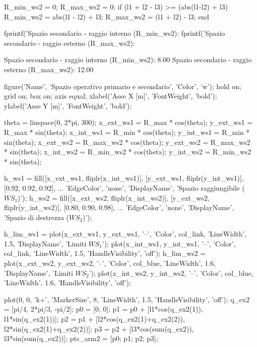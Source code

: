 \documentclass[11pt, a4paper]{article}
\begin{document}
\begin{matlabcode}
R_min_ws2 = 0;
R_max_ws2 = 0;
if (l1 + l2 - l3) >= (abs(l1-l2) + l3)
    R_min_ws2 = abs(l1 - l2) + l3;
    R_max_ws2 = (l1 + l2) - l3;
end

fprintf('Spazio secondario - raggio interno (R_min_ws2): %
fprintf('Spazio secondario - raggio esterno (R_max_ws2): %
\end{matlabcode}
\begin{matlaboutput}
Spazio secondario - raggio interno (R_min_ws2): 8.00
Spazio secondario - raggio esterno (R_max_ws2): 12.00
\end{matlaboutput}
\newpage
\begin{matlabcode}
figure('Name', 'Spazio operativo primario e secondario', 'Color', 'w');
hold on; grid on; box on; axis equal;
xlabel('Asse X [m]', 'FontWeight', 'bold');
ylabel('Asse Y [m]', 'FontWeight', 'bold');

theta = linspace(0, 2*pi, 300);
x_ext_ws1 = R_max * cos(theta);      y_ext_ws1 = R_max * sin(theta);
x_int_ws1 = R_min * cos(theta);      y_int_ws1 = R_min * sin(theta);
x_ext_ws2 = R_max_ws2 * cos(theta);  y_ext_ws2 = R_max_ws2 * sin(theta);
x_int_ws2 = R_min_ws2 * cos(theta);  y_int_ws2 = R_min_ws2 * sin(theta);

h_ws1 = fill([x_ext_ws1, fliplr(x_int_ws1)], [y_ext_ws1, fliplr(y_int_ws1)], [0.92, 0.92, 0.92], ...
    'EdgeColor', 'none', 'DisplayName', 'Spazio raggiungibile ($WS_1$)');
h_ws2 = fill([x_ext_ws2, fliplr(x_int_ws2)], [y_ext_ws2, fliplr(y_int_ws2)], [0.80, 0.90, 0.98], ...
    'EdgeColor', 'none', 'DisplayName', 'Spazio di destrezza ($WS_2$)');

h_lim_ws1 = plot(x_ext_ws1, y_ext_ws1, '--', 'Color', col_link, 'LineWidth', 1.5, 'DisplayName', 'Limiti $WS_1$');
plot(x_int_ws1, y_int_ws1, '--', 'Color', col_link, 'LineWidth', 1.5, 'HandleVisibility', 'off');
h_lim_ws2 = plot(x_ext_ws2, y_ext_ws2, '--', 'Color', col_blue, 'LineWidth', 1.6, 'DisplayName', 'Limiti $WS_2$');
plot(x_int_ws2, y_int_ws2, '--', 'Color', col_blue, 'LineWidth', 1.6, 'HandleVisibility', 'off');

plot(0, 0, 'k+', 'MarkerSize', 8, 'LineWidth', 1.5, 'HandleVisibility', 'off');
q_ex2 = [pi/4, 2*pi/3, -pi/2];
p0 = [0, 0];
p1 = p0 + [l1*cos(q_ex2(1)), l1*sin(q_ex2(1))];
p2 = p1 + [l2*cos(q_ex2(1)+q_ex2(2)), l2*sin(q_ex2(1)+q_ex2(2))];
p3 = p2 + [l3*cos(sum(q_ex2)), l3*sin(sum(q_ex2))];
pts_arm2 = [p0; p1; p2; p3];


\end{matlabcode}
\end{document}
